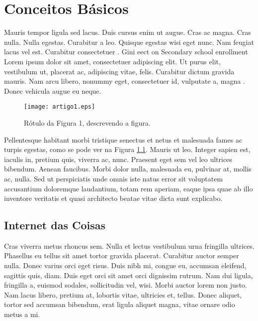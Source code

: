 %
%

\chapter{Conceitos B\'{a}sicos}
Mauris tempor ligula sed lacus. Duis cursus enim ut augue. Cras ac magna. Cras nulla. Nulla egestas. Curabitur a leo. Quisque egestas wisi eget nunc. Nam feugiat lacus vel est. Curabitur consectetuer \cite{006-000}. Gini eect on Secondary school enrollment Lorem ipsum dolor sit amet, consectetuer adipiscing elit. Ut purus elit, vestibulum ut, placerat ac, adipiscing vitae, felis. Curabitur dictum gravida mauris. Nam arcu libero, nonummy eget, consectetuer id, vulputate a, magna \citep{000-004}. Donec vehicula augue eu neque.



\begin{figure}[!h]
	\centering
	\texttt{[image: artigo1.eps]}
	\caption{R\'{o}tulo da Figura 1, descrevendo a figura.}
	\label{fig:artigo1}
\end{figure}

Pellentesque habitant morbi tristique senectus et netus et malesuada fames ac turpis egestas, como se pode ver na Figura \ref{fig:artigo1}. Mauris ut leo. Integer sapien est, iaculis in, pretium quis, viverra ac, nunc. Praesent eget sem vel leo ultrices bibendum. Aenean faucibus. Morbi dolor nulla, malesuada eu, pulvinar at, mollis ac, nulla. Sed ut perspiciatis unde omnis iste natus error sit voluptatem accusantium doloremque laudantium, totam rem aperiam, eaque ipsa quae ab illo inventore veritatis et quasi architecto beatae vitae dicta sunt explicabo.

\section{Internet das Coisas}
Cras viverra metus rhoncus sem. Nulla et lectus vestibulum urna fringilla ultrices. Phasellus eu tellus sit amet tortor gravida placerat. Curabitur auctor semper nulla. Donec varius orci eget risus. Duis nibh mi, congue eu, accumsan eleifend, sagittis quis, diam. Duis eget orci sit amet orci dignissim rutrum. Nam dui ligula, fringilla a, euismod sodales, sollicitudin vel, wisi. Morbi auctor lorem non justo. Nam lacus libero, pretium at, lobortis vitae, ultricies et, tellus. Donec aliquet, tortor sed accumsan bibendum, erat ligula aliquet magna, vitae ornare odio metus a mi.

